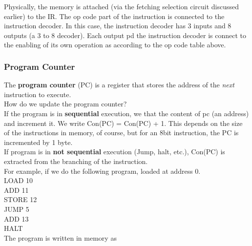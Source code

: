 \documentclass[]{article}
\begin{document}
Physically, the memory is attached (via the fetching selection circuit discussed earlier) to the IR. The op code part of the instruction is connected to the instruction decoder. In this case, the instruction decoder has 3 inputs and 8 outputs (a 3 to 8 decoder). Each output pd the instruction decoder is connect to the enabling of its own operation as according to the op code table above.\\


\subsubsection{Program Counter}
\bigbreak

The \textbf{program counter} (PC) is a register that stores the address of the \textit{next} instruction to execute. \\

How do we update the program counter? \\

If the program is in \textbf{sequential} execution, we that the content of pc (an address) and increment it. We write Con(PC) = Con(PC) + 1. This depends on the size of the instructions in memory, of course, but for an 8bit instruction, the PC is incremented by 1 byte. \\

If program is in \textbf{not sequential} execution (Jump, halt, etc.), Con(PC) is extracted from the branching of the instruction.\\

For example, if we do the following program, loaded at address 0.\\

LOAD 10\\
ADD 11\\
STORE 12\\
JUMP 5\\
ADD 13\\
HALT\\

The program is written in memory as
\end{document}

